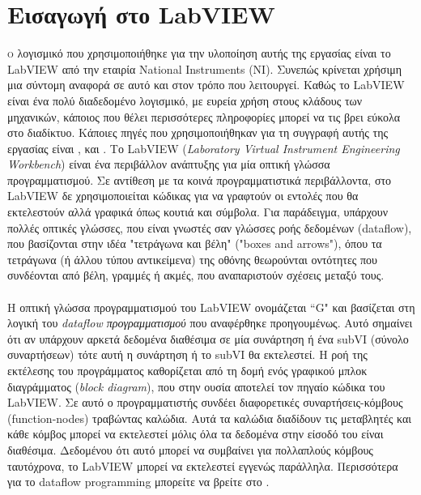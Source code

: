 


\section{Εισαγωγή στο LabVIEW}




\lettrine[findent=2pt]{}{ο} λογισμικό που χρησιμοποιήθηκε για την υλοποίηση αυτής της εργασίας είναι το LabVIEW από την εταιρία National Instruments (ΝΙ). Συνεπώς κρίνεται χρήσιμη μια σύντομη αναφορά σε αυτό και στον τρόπο που λειτουργεί. Καθώς το LabVIEW είναι ένα πολύ διαδεδομένο λογισμικό, με ευρεία χρήση στους κλάδους των μηχανικών, κάποιος που θέλει περισσότερες πληροφορίες μπορεί να τις βρει εύκολα στο διαδίκτυο. Κάποιες πηγές που χρησιμοποιήθηκαν για τη συγγραφή αυτής της εργασίας είναι \cite{labview1}, \cite{labview2} και \cite{labview3}. Το LabVIEW (\emph{Laboratory Virtual Instrument Engineering Workbench}) είναι ένα περιβάλλον ανάπτυξης για μία οπτική γλώσσα προγραμματισμού. Σε αντίθεση με τα κοινά προγραμματιστικά περιβάλλοντα, στο LabVIEW δε χρησιμοποιείται κώδικας για να γραφτούν οι εντολές που θα εκτελεστούν αλλά γραφικά όπως κουτιά και σύμβολα. Για παράδειγμα, υπάρχουν πολλές οπτικές γλώσσες, που είναι γνωστές σαν γλώσσες ροής δεδομένων (dataflow), που βασίζονται στην ιδέα "τετράγωνα και βέλη" ("boxes and arrows"), όπου τα τετράγωνα (ή άλλου τύπου αντικείμενα) της οθόνης θεωρούνται οντότητες που συνδέονται από βέλη, γραμμές ή ακμές, που αναπαριστούν σχέσεις μεταξύ τους.

\paragraph{}Η οπτική γλώσσα προγραμματισμού του LabVIEW ονομάζεται ``G" και βασίζεται στη λογική του \emph{dataflow προγραμματισμού} που αναφέρθηκε προηγουμένως. Αυτό σημαίνει ότι αν υπάρχουν αρκετά δεδομένα διαθέσιμα σε μία συνάρτηση ή ένα subVI (σύνολο συναρτήσεων) τότε αυτή η συνάρτηση ή το subVI θα εκτελεστεί. Η ροή της εκτέλεσης του προγράμματος καθορίζεται από τη δομή ενός γραφικού μπλοκ διαγράμματος (\emph{block diagram}), που στην ουσία αποτελεί τον πηγαίο κώδικα του LabVIEW. Σε αυτό ο προγραμματιστής συνδέει διαφορετικές συναρτήσεις-κόμβους (function-nodes) τραβώντας καλώδια. Αυτά τα καλώδια διαδίδουν τις μεταβλητές και κάθε κόμβος μπορεί να εκτελεστεί μόλις όλα τα δεδομένα στην είσοδό του είναι διαθέσιμα. Δεδομένου ότι αυτό μπορεί να συμβαίνει για πολλαπλούς κόμβους ταυτόχρονα, το LabVIEW μπορεί να εκτελεστεί εγγενώς παράλληλα. Περισσότερα για το dataflow programming μπορείτε να βρείτε στο \cite{dataflow_programming}.

